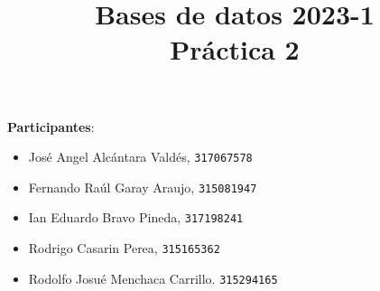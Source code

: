 \documentclass[12pt,letterpaper]{article}
\title{Bases de datos 2023-1\\
Práctica 2}
\begin{document}
\maketitle

\textbf{Participantes}:
\begin{itemize}
	\item José Angel Alcántara Valdés, \texttt{317067578}\\
	\item Fernando Raúl Garay Araujo, \texttt{315081947}\\
	\item Ian Eduardo Bravo Pineda, \texttt{317198241}\\
	\item Rodrigo Casarin Perea, \texttt{315165362}\\
	\item Rodolfo Josué Menchaca Carrillo. \texttt{315294165}\\
\end{itemize}
\end{document}
